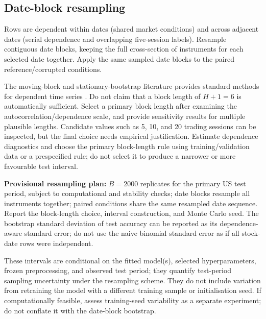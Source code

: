 \documentclass[11pt,a4paper]{article}
\begin{document}
\subsection{Date-block resampling}

Rows are dependent within dates (shared market conditions) and across adjacent dates (serial dependence and overlapping five-session labels). Resample contiguous date blocks, keeping the full cross-section of instruments for each selected date together. Apply the same sampled date blocks to the paired reference/corrupted conditions.

The moving-block and stationary-bootstrap literature provides standard methods for dependent time series \cite{Kunsch1989,PolitisRomano1994}. Do not claim that a block length of $H+1=6$ is automatically sufficient. Select a primary block length after examining the autocorrelation/dependence scale, and provide sensitivity results for multiple plausible lengths. Candidate values such as 5, 10, and 20 trading sessions can be inspected, but the final choice needs empirical justification. Estimate dependence diagnostics and choose the primary block-length rule using training/validation data or a prespecified rule; do not select it to produce a narrower or more favourable test interval.

\textbf{Provisional resampling plan:} $B=2000$ replicates for the primary US test period, subject to computational and stability checks; date blocks resample all instruments together; paired conditions share the same resampled date sequence. Report the block-length choice, interval construction, and Monte Carlo seed. The bootstrap standard deviation of test accuracy can be reported as its dependence-aware standard error; do not use the naive binomial standard error as if all stock-date rows were independent.

These intervals are conditional on the fitted model(s), selected hyperparameters, frozen preprocessing, and observed test period; they quantify test-period sampling uncertainty under the resampling scheme. They do not include variation from retraining the model with a different training sample or initialisation seed. If computationally feasible, assess training-seed variability as a separate experiment; do not conflate it with the date-block bootstrap.
\end{document}
